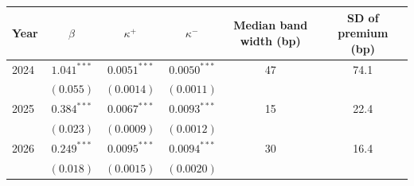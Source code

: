 \begin{tabular}{lccccc}
\toprule
 Year & $\beta$ & $\kappa^+$ & $\kappa^-$ & Median band width (bp) & SD of premium (bp) \\
\midrule
2024 & $1.041^{***}$ & $0.0051^{***}$ & $0.0050^{***}$ & 47 & 74.1 \\
 & $(0.055)$ & $(0.0014)$ & $(0.0011)$ & & \\
2025 & $0.384^{***}$ & $0.0067^{***}$ & $0.0093^{***}$ & 15 & 22.4 \\
 & $(0.023)$ & $(0.0009)$ & $(0.0012)$ & & \\
2026 & $0.249^{***}$ & $0.0095^{***}$ & $0.0094^{***}$ & 30 & 16.4 \\
 & $(0.018)$ & $(0.0015)$ & $(0.0020)$ & & \\
\bottomrule
\end{tabular}
